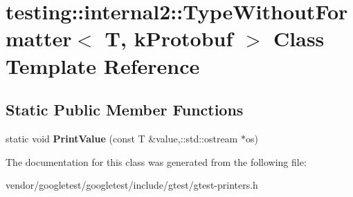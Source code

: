 \hypertarget{classtesting_1_1internal2_1_1TypeWithoutFormatter_3_01T_00_01kProtobuf_01_4}{}\section{testing\+:\+:internal2\+:\+:Type\+Without\+Formatter$<$ T, k\+Protobuf $>$ Class Template Reference}
\label{classtesting_1_1internal2_1_1TypeWithoutFormatter_3_01T_00_01kProtobuf_01_4}
\subsection*{Static Public Member Functions}
\begin{DoxyCompactItemize}
\item 
static void {\bfseries Print\+Value} (const T \&value,\+::std\+::ostream $\ast$os)\hypertarget{classtesting_1_1internal2_1_1TypeWithoutFormatter_3_01T_00_01kProtobuf_01_4_a714da93952c590db954228bd9cc60abf}{}\label{classtesting_1_1internal2_1_1TypeWithoutFormatter_3_01T_00_01kProtobuf_01_4_a714da93952c590db954228bd9cc60abf}

\end{DoxyCompactItemize}


The documentation for this class was generated from the following file\+:\begin{DoxyCompactItemize}
\item 
vendor/googletest/googletest/include/gtest/gtest-\/printers.\+h\end{DoxyCompactItemize}
